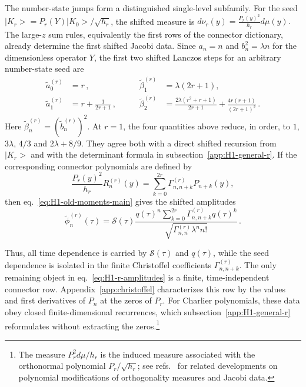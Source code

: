 \documentclass[a4paper,11pt]{article}
\def\ket#1{|#1>}%
\def\dd{d}%
\theoremstyle{definition}
\theoremstyle{remark}
\newcommand{\ket}[1]{|#1\rangle}
\newcommand{\dd}{\mathrm d}
\newcommand{\tphi}{\widetilde\phi}
\newcommand{\cS}{\mathcal S}
\begin{document}
The number-state jumps form a distinguished single-level subfamily. For the seed $\ket{K_r}=P_r(Y)\ket{K_0}/\sqrt{h_r}$, the shifted measure is
$
   \dd\nu_r(y)=\frac{P_r(y)^2}{h_r}\dd\mu(y).
$
The large-$z$ sum rules, equivalently the first rows of the connector dictionary, already determine the first shifted Jacobi data. Since $a_n=n$ and $b_n^2=\lambda n$ for the dimensionless operator $Y$, the first two shifted Lanczos steps for an arbitrary number-state seed are 
\begin{equation}
\begin{aligned}
   \widetilde a_0^{(r)}&=r\,,\qquad
   &\widetilde\beta_1^{(r)}&=\lambda(2r+1),\\
   \widetilde a_1^{(r)}&=r+\frac{1}{2r+1}\,,\qquad
   &\widetilde\beta_2^{(r)}&=
   \frac{2\lambda(r^2+r+1)}{2r+1}
   +\frac{4r(r+1)}{(2r+1)^2}\,.
\end{aligned}
   \label{eq:H1-local-sum-rule-check-main}
\end{equation}
Here $\widetilde\beta_n^{(r)}=(\widetilde b_n^{(r)})^2$. At $r=1$, the four quantities above reduce, in order, to $1$, $3\lambda$, $4/3$ and $2\lambda+8/9$. They agree both with a direct shifted recursion from $\ket{K_r}$ and with the determinant formula in subsection~\ref{app:H1-general-r}. If the corresponding connector polynomials are defined by
\begin{equation}
   \frac{P_r(y)^2}{h_r}R_n^{(r)}(y)=\sum_{k=0}^{2r}\Gamma_{n,n+k}^{(r)}P_{n+k}(y),
   \label{eq:H1-r-connector}
\end{equation}
then eq.~\eqref{eq:H1-old-moments-main} gives the shifted amplitudes
\begin{equation}
   \tphi_n^{(r)}(\tau)=\cS(\tau)
   \frac{q(\tau)^n\sum_{k=0}^{2r}\Gamma_{n,n+k}^{(r)}q(\tau)^k}{\sqrt{\Gamma_{n,n}^{(r)}\lambda^n n!}}\,.
   \label{eq:H1-r-amplitudes}
\end{equation}

Thus, all time dependence is carried by $\cS(\tau)$ and $q(\tau)$, while the seed dependence is isolated in the finite Christoffel coefficients $\Gamma_{n,n+k}^{(r)}$. The only remaining object in eq.~\eqref{eq:H1-r-amplitudes} is a finite, time-independent connector row. Appendix~\ref{app:christoffel} characterizes this row by the values and first derivatives of $P_n$ at the zeros of $P_r$. For Charlier polynomials, these data obey closed finite-dimensional recurrences, which subsection~\ref{app:H1-general-r} reformulates without extracting the zeros.\footnote{The measure \(P_r^2\dd\mu/h_r\) is the induced measure associated with the orthonormal polynomial \(P_r/\sqrt{h_r}\); see refs.~\cite{KautskyGolub1983,GautschiLi1993,DuranChristoffel2021} for related developments on polynomial modifications of orthogonality measures and Jacobi data.}
\end{document}
